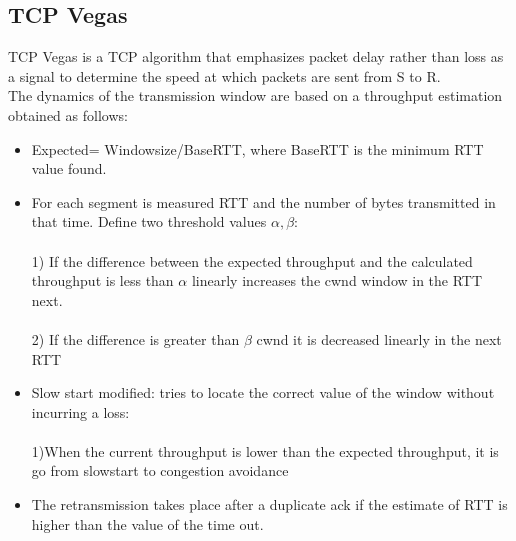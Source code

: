 {{\subsection{\normalsize TCP Vegas}{
TCP Vegas is a TCP algorithm that emphasizes packet delay rather than loss as a signal to determine the speed at which packets are sent from S to R.\\ 
The dynamics of the transmission window are based on a
throughput estimation obtained as follows:
\begin{itemize}
\item  Expected= Windowsize/BaseRTT, where BaseRTT is the minimum RTT value found.
\item For each segment is measured RTT and the number of bytes transmitted in that time. Define two threshold values $\alpha,\beta$:\\\\1) If the difference between the expected throughput and the calculated throughput is less than $\alpha$ linearly increases the cwnd window in the RTT next.\\\\2) If the difference is greater than $\beta$ cwnd it is decreased linearly in the next RTT
\item Slow start modified: tries to locate the correct value of the window without incurring a loss:\\\\1)When the current throughput is lower than the expected throughput, it is
go from slowstart to congestion avoidance
\item The retransmission takes place after a duplicate ack if the estimate of RTT is higher than the value of the time out.
\end{itemize}
}
}}
